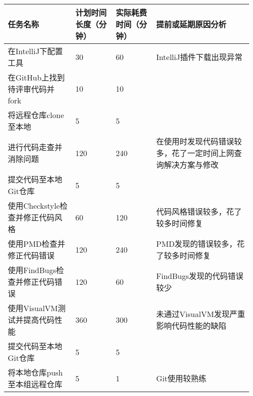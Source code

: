 \begin{longtable}{|X|X|X|X|}  
\hline
\textbf{任务名称} & \textbf{计划时间长度（分钟）} & \textbf{实际耗费时间（分钟）} & \textbf{提前或延期原因分析} \\
\hline
\endhead
在IntelliJ下配置工具 & 30 & 60 & IntelliJ插件下载出现异常 \\
\hline
在GitHub上找到待评审代码并fork & 10 & 10 & \\
\hline
将远程仓库clone至本地 & 5 & 5 & \\
\hline
进行代码走查并消除问题 & 120 & 240 & 在使用时发现代码错误较多，花了一定时间上网查询解决方案与修改 \\
\hline
提交代码至本地Git仓库 & 5 & 5 & \\
\hline
使用Checkstyle检查并修正代码风格 & 60 & 120 & 代码风格错误较多，花了较多时间修复 \\
\hline
使用PMD检查并修正代码错误 & 120 & 240 & PMD发现的错误较多，花了较多时间修复 \\
\hline
使用FindBugs检查并修正代码错误 & 120 & 60 & FindBugs发现的代码错误较少 \\
\hline
使用VisualVM测试并提高代码性能 & 360 & 300 & 未通过VisualVM发现严重影响代码性能的缺陷 \\
\hline
提交代码至本地Git仓库 & 5 & 5 & \\
\hline
将本地仓库push至本组远程仓库 & 5 & 1 & Git使用较熟练\\
\hline
\end{longtable}   
